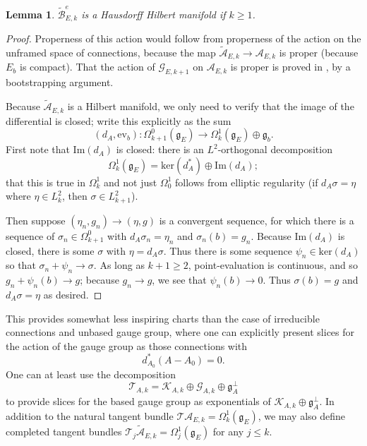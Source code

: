 \documentclass[10pt,a4paper]{amsart}
\newtheorem{lemma}[theorem]{Lemma}
\theoremstyle{definition}
\theoremstyle{remark}
\numberwithin{figure}{qchap}
\begin{document}
\begin{lemma}$\widetilde{\mathcal B}^e_{E,k}$ is a Hausdorff Hilbert manifold if $k \geq 1$.
\end{lemma}

\begin{proof}Properness of this action would follow from properness of the action on the unframed space of connections, because the map $\widetilde{\mathcal A}_{E,k} \to \mathcal A_{E,k}$ is proper (because $E_b$ is compact). That the action of $\mathcal G_{E,k+1}$ on $\mathcal A_{E,k}$ is proper is proved in \cite[Section~2.3.7]{DK}, by a bootstrapping argument. 

Because $\widetilde{\mathcal A}_{E,k}$ is a Hilbert manifold, we only need to verify that the image of the differential is closed; write this explicitly as the sum 
$$(d_A, \text{ev}_b): \Omega^0_{k+1}(\mathfrak g_E) \to \Omega^1_k(\mathfrak g_E) \oplus \mathfrak g_b.$$ 
First note that $\text{Im}(d_A)$ is closed: there is an $L^2$-orthogonal decomposition 
$$\Omega^1_k(\mathfrak g_E) = \text{ker}(d_A^*) \oplus \text{Im}(d_A);$$ 
that this is true in $\Omega^1_k$ and not just $\Omega^1_0$ follows from elliptic regularity (if $d_A \sigma = \eta$ where $\eta \in L^2_k$, then $\sigma \in L^2_{k+1}$).

Then suppose $(\eta_n, g_n) \to (\eta, g)$ is a convergent sequence, for which there is a sequence of $\sigma_n \in \Omega^0_{k+1}$ with $d_A \sigma_n = \eta_n$ and $\sigma_n(b) = g_n$. Because $\text{Im}(d_A)$ is closed, there is some $\sigma$ with $\eta = d_A \sigma$. Thus there is some sequence $\psi_n \in \text{ker}(d_A)$ so that $\sigma_n + \psi_n \to \sigma$. As long as $k+1 \geq 2$, point-evaluation is continuous, and so $g_n + \psi_n(b) \to g$; because $g_n \to g$, we see that $\psi_n(b) \to 0$. Thus $\sigma(b) = g$ and $d_A \sigma = \eta$ as desired.
\end{proof}

This provides somewhat less inspiring charts than the case of irreducible connections and unbased gauge group, where one can explicitly present slices for the action of the gauge group as those connections with 
$$d^*_{A_0}(A-A_0) = 0.$$ 
One can at least use the decomposition 
$$\mathcal T_{A,k} = \mathcal K_{A,k} \oplus \mathcal G_{A,k} \oplus \mathfrak g_A^\perp$$
to provide slices for the based gauge group as exponentials of $\mathcal K_{A,k} \oplus \mathfrak g_A^\perp$. In addition to the natural tangent bundle $\mathcal T\mathcal A_{E,k} = \Omega^1_k(\mathfrak g_E)$, we may also define completed tangent bundles $\mathcal T_j \widetilde{\mathcal A}_{E,k} = \Omega^1_j(\mathfrak g_E)$ for any $j \leq k$.
\end{document}
